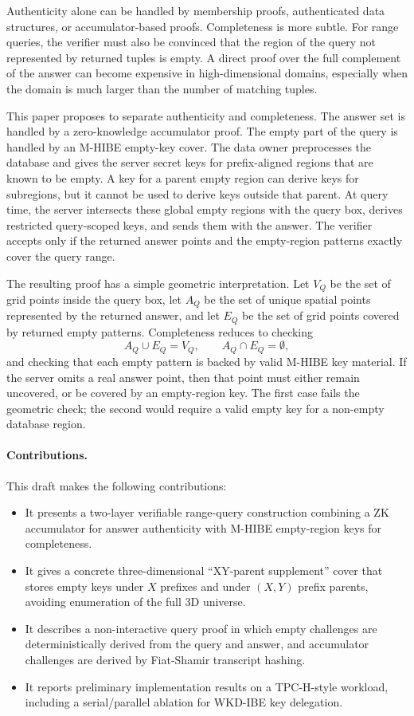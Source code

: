 \documentclass[11pt]{article}
\begin{document}
Authenticity alone can be handled by membership proofs, authenticated data structures, or accumulator-based proofs. Completeness is more subtle. For range queries, the verifier must also be convinced that the region of the query not represented by returned tuples is empty. A direct proof over the full complement of the answer can become expensive in high-dimensional domains, especially when the domain is much larger than the number of matching tuples.

This paper proposes to separate authenticity and completeness. The answer set is handled by a zero-knowledge accumulator proof. The empty part of the query is handled by an M-HIBE empty-key cover. The data owner preprocesses the database and gives the server secret keys for prefix-aligned regions that are known to be empty. A key for a parent empty region can derive keys for subregions, but it cannot be used to derive keys outside that parent. At query time, the server intersects these global empty regions with the query box, derives restricted query-scoped keys, and sends them with the answer. The verifier accepts only if the returned answer points and the empty-region patterns exactly cover the query range.

The resulting proof has a simple geometric interpretation. Let $V_Q$ be the set of grid points inside the query box, let $A_Q$ be the set of unique spatial points represented by the returned answer, and let $E_Q$ be the set of grid points covered by returned empty patterns. Completeness reduces to checking
\[
  A_Q \cup E_Q = V_Q,
  \qquad
  A_Q \cap E_Q = \emptyset,
\]
and checking that each empty pattern is backed by valid M-HIBE key material. If the server omits a real answer point, then that point must either remain uncovered, or be covered by an empty-region key. The first case fails the geometric check; the second would require a valid empty key for a non-empty database region.

\paragraph{Contributions.}
This draft makes the following contributions:
\begin{itemize}[leftmargin=*]
  \item It presents a two-layer verifiable range-query construction combining a ZK accumulator for answer authenticity with M-HIBE empty-region keys for completeness.
  \item It gives a concrete three-dimensional ``XY-parent supplement'' cover that stores empty keys under $X$ prefixes and under $(X,Y)$ prefix parents, avoiding enumeration of the full 3D universe.
  \item It describes a non-interactive query proof in which empty challenges are deterministically derived from the query and answer, and accumulator challenges are derived by Fiat-Shamir transcript hashing.
  \item It reports preliminary implementation results on a TPC-H-style workload, including a serial/parallel ablation for WKD-IBE key delegation.
\end{itemize}
\end{document}
